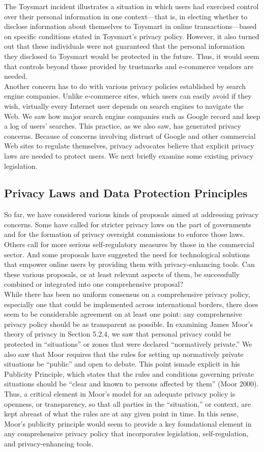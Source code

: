 \documentclass[12pt]{article}
\theoremstyle{definition}
\begin{document}
The Toysmart incident illustrates a situation in which users had exercised control
over their personal information in one context—that is, in electing whether to disclose
information about themselves to Toysmart in online transactions—based on specific
conditions stated in Toysmart’s privacy policy. However, it also turned out that
these individuals were not guaranteed that the personal information they disclosed to
Toysmart would be protected in the future. Thus, it would seem that controls beyond
those provided by trustmarks and e-commerce vendors are needed.\\
Another concern has to do with various privacy policies established by search engine
companies. Unlike e-commerce sites, which users can easily avoid if they wish, virtually
every Internet user depends on search engines to navigate the Web. We saw how major search engine companies such as Google record and keep a log of users’
searches. This practice, as we also saw, has generated privacy concerns. Because of concerns involving distrust of Google and other commercial Web sites to
regulate themselves, privacy advocates believe that explicit privacy laws are needed to
protect users. We next briefly examine some existing privacy legislation.
\subsection{Privacy Laws and Data Protection Principles}
So far, we have considered various kinds of proposals aimed at addressing privacy
concerns. Some have called for stricter privacy laws on the part of governments and for
the formation of privacy oversight commissions to enforce those laws. Others call for
more serious self-regulatory measures by those in the commercial sector. And some
proposals have suggested the need for technological solutions that empower online users by providing them with privacy-enhancing tools. Can these various proposals, or at least
relevant aspects of them, be successfully combined or integrated into one comprehensive
proposal?\\
While there has been no uniform consensus on a comprehensive privacy policy,
especially one that could be implemented across international borders, there does seem
to be considerable agreement on at least one point: any comprehensive privacy policy
should be as transparent as possible. In examining James Moor’s theory of privacy in
Section 5.2.4, we saw that personal privacy could be protected in “situations” or zones that
were declared “normatively private.” We also saw that Moor requires that the rules for
setting up normatively private situations be “public” and open to debate. This point ismade
explicit in his Publicity Principle, which states that the rules and conditions governing
private situations should be “clear and known to persons affected by them” (Moor 2000).
Thus, a critical element in Moor’s model for an adequate privacy policy is openness, or
transparency, so that all parties in the “situation,” or context, are kept abreast of what the
rules are at any given point in time. In this sense, Moor’s publicity principle would seem to
provide a key foundational element in any comprehensive privacy policy that incorporates
legislation, self-regulation, and privacy-enhancing tools.
\clearpage
\end{document}
